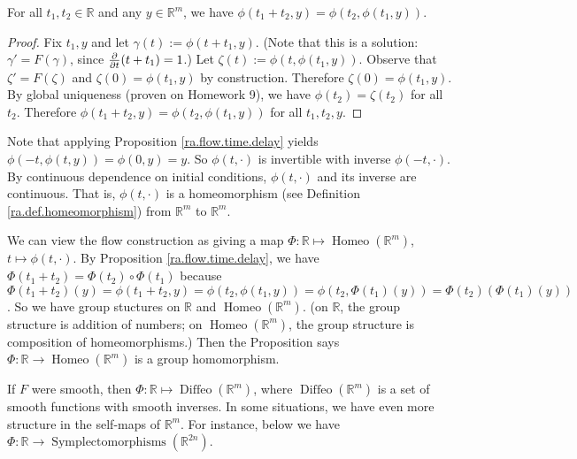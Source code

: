 \begin{proposition}\label{ra.flow.time.delay}

For all \(t_1, t_2 \in \mathbb{R}\) and any \(y \in \mathbb{R}^m\), we have \(\phi(t_1 + t_2, y) = \phi(t_2, \phi(t_1, y))\). 

\end{proposition}

\begin{proof}

Fix \(t_1, y\) and let \(\gamma(t) := \phi(t + t_1, y)\). (Note that this is a solution: \(\gamma' = F(\gamma)\), since \(\pderiv{}{t} (t + t_1) = 1\).) Let \(\zeta (t) := \phi(t, \phi(t_1, y))\). Observe that \(\zeta' = F(\zeta)\) and \(\zeta(0) = \phi(t_1, y)\) by construction. Therefore \(\zeta(0 ) = \phi(t_1, y)\). By global uniqueness (proven on Homework 9), we have \(\phi(t_2) = \zeta(t_2)\) for all \(t_2\). Therefore \(\phi(t_1 + t_2, y) = \phi(t_2, \phi(t_1, y)) \) for all \(t_1, t_2, y\).

\end{proof}

Note that applying Proposition \ref{ra.flow.time.delay} yields \(\phi(-t, \phi(t,y)) = \phi(0, y) = y\). So \(\phi(t, \cdot)\) is invertible with inverse \(\phi(-t, \cdot)\). By continuous dependence on initial conditions, \(\phi(t, \cdot) \) and its inverse are continuous. That is, \(\phi(t, \cdot)\) is a homeomorphism (see Definition \ref{ra.def.homeomorphism}) from \(\mathbb{R}^m\) to \(\mathbb{R}^m\).

We can view the flow construction as giving a map \(\Phi: \mathbb{R} \mapsto \operatorname{Homeo}(\mathbb{R}^m)\), \(t \mapsto \phi(t, \cdot)\). By Proposition \ref{ra.flow.time.delay}, we have \(\Phi(t_1 + t_2) = \Phi(t_2) \circ \Phi(t_1)\) because \(\Phi(t_1 + t_2)(y) = \phi(t_1 + t_2, y) = \phi(t_2, \phi(t_1, y)) = \phi(t_2, \Phi(t_1)(y)) = \Phi(t_2) \left( \Phi(t_1)(y) \right)\). So we have group stuctures on \(\mathbb{R}\) and \(\operatorname{Homeo}(\mathbb{R}^m)\). (on \(\mathbb{R}\), the group structure is addition of numbers; on \(\operatorname{Homeo}(\mathbb{R}^m)\), the group structure is composition of homeomorphisms.) Then the Proposition says \(\Phi: \mathbb{R} \to  \operatorname{Homeo}(\mathbb{R}^m)\) is a group homomorphism. 

If \(F\) were smooth, then \(\Phi : \mathbb{R} \mapsto \operatorname{Diffeo}(\mathbb{R}^m) \), where \(\operatorname{Diffeo}(\mathbb{R}^m)\) is a set of smooth functions with smooth inverses. In some situations, we have even more structure in the self-maps of \(\mathbb{R}^m\). For instance, below we have \(\Phi: \mathbb{R} \to \operatorname{Symplectomorphisms}(\mathbb{R}^{2n})\). 

